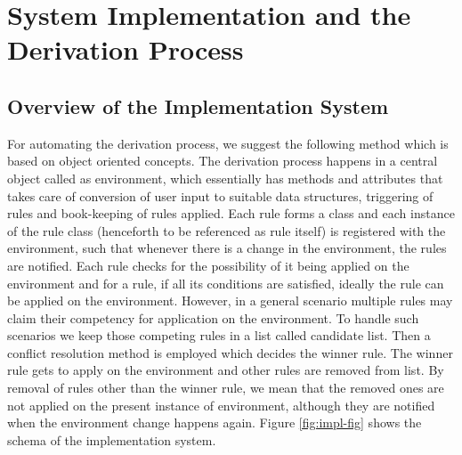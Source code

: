 \documentclass[a4paper,11pt,twoside,openright]{report}
\begin{document}
 
\chapter{System Implementation and the Derivation Process}
\label{chapter 4}


\section{Overview of the Implementation System }
\label{sect:impl}

For automating the derivation process, we suggest the following method which is based on object oriented concepts. The derivation process happens in a central object called as environment, which essentially has methods and attributes that takes care of conversion of user input to suitable data structures, triggering of rules and book-keeping of rules applied. Each rule forms a class and each instance of the rule class (henceforth to be referenced as rule itself) is registered with the environment, such that whenever there is a change in the environment, the rules are notified. Each rule checks for the possibility of it being applied on the environment and for a rule, if all its conditions are satisfied, ideally the rule can be applied on the environment. However, in a general scenario  multiple rules may claim their competency for application on the environment. To handle such scenarios we keep those competing rules in a list called candidate list. Then a conflict resolution method is employed which decides the winner rule. The winner rule gets to apply on the environment and other rules are removed from list. By removal of rules other than the winner rule, we mean that the removed ones are not applied on the present instance of environment, although they are notified when the environment change happens again. Figure \ref{fig:impl-fig} shows the schema of the implementation system.
\\
\end{document}
